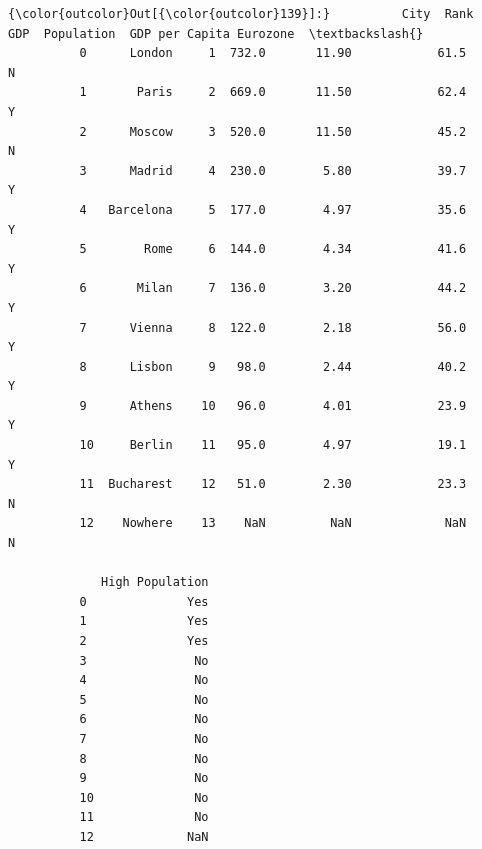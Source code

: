 \documentclass[11pt]{article}
\begin{document}
\begin{Verbatim}[commandchars=\\\{\}]
{\color{outcolor}Out[{\color{outcolor}139}]:}          City  Rank    GDP  Population  GDP per Capita Eurozone  \textbackslash{}
          0      London     1  732.0       11.90            61.5        N   
          1       Paris     2  669.0       11.50            62.4        Y   
          2      Moscow     3  520.0       11.50            45.2        N   
          3      Madrid     4  230.0        5.80            39.7        Y   
          4   Barcelona     5  177.0        4.97            35.6        Y   
          5        Rome     6  144.0        4.34            41.6        Y   
          6       Milan     7  136.0        3.20            44.2        Y   
          7      Vienna     8  122.0        2.18            56.0        Y   
          8      Lisbon     9   98.0        2.44            40.2        Y   
          9      Athens    10   96.0        4.01            23.9        Y   
          10     Berlin    11   95.0        4.97            19.1        Y   
          11  Bucharest    12   51.0        2.30            23.3        N   
          12    Nowhere    13    NaN         NaN             NaN        N   
          
             High Population  
          0              Yes  
          1              Yes  
          2              Yes  
          3               No  
          4               No  
          5               No  
          6               No  
          7               No  
          8               No  
          9               No  
          10              No  
          11              No  
          12             NaN  
\end{Verbatim}
            
\end{document}
